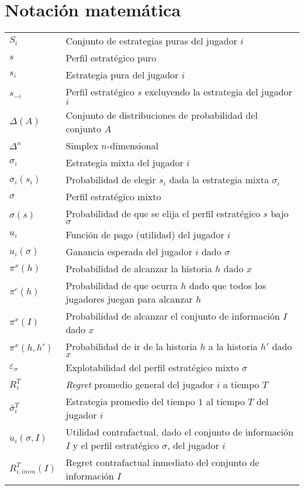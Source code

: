 \chapter*{Notación matemática}
\begingroup
\renewcommand{\arraystretch}{1.5}
\begin{tabular}{l p{12cm}}
$S_i$ & Conjunto de estrategias puras del jugador $i$ \\
$s$ & Perfil estratégico puro \\
$s_i$ & Estrategia pura del jugador $i$ \\
$s_{-i}$ & Perfil estratégico $s$ excluyendo la estrategia del jugador $i$ \\
$\Delta(A)$ & Conjunto de distribuciones de probabilidad del conjunto $A$ \\
$\Delta^n$ & Simplex $n$-dimensional \\
$\sigma_i$ & Estrategia mixta del jugador $i$ \\
$\sigma_i(s_i)$ & Probabilidad de elegir $s_i$ dada la estrategia mixta $\sigma_i$ \\
$\sigma$ & Perfil estratégico mixto \\
$\sigma(s)$ & Probabilidad de que se elija el perfil estratégico $s$ bajo $\sigma$ \\
$u_i$ & Función de pago (utilidad) del jugador $i$ \\
$u_i(\sigma)$ & Ganancia esperada del jugador $i$ dado $\sigma$ \\
$\pi^{x}(h)$ & Probabilidad de alcanzar la historia $h$ dado $x$ \\
$\pi^c(h)$ & Probabilidad de que ocurra $h$ dado que todos los jugadores juegan para alcanzar $h$ \\
$\pi^x(I)$ & Probabilidad de alcanzar el conjunto de información $I$ dado $x$ \\
$\pi^x(h, h')$ & Probabilidad de ir de la historia $h$ a la historia $h'$ dado $x$ \\
$\varepsilon_{\sigma}$ & Explotabilidad del perfil estratégico mixto $\sigma$ \\
$R_i^T$ & \textit{Regret} promedio general del jugador $i$ a tiempo $T$ \\
$\bar\sigma^T_i$ & Estrategia promedio del tiempo $1$ al tiempo $T$ del jugador $i$ \\
$u_i(\sigma, I)$ & Utilidad contrafactual, dado el conjunto de información $I$ y el perfil estratégico $\sigma$, del jugador $i$ \\
$R^T_{i, imm}(I)$ & Regret contrafactual inmediato del conjunto de información $I$
\end{tabular}
\endgroup